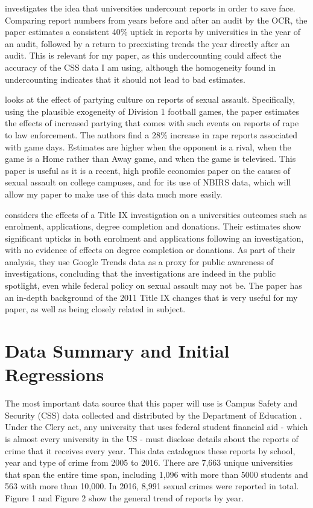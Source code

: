 \documentclass[AER]{AEA}
\begin{document}
 investigates the idea that universities undercount reports in order to save face.  Comparing report numbers from years before and after an audit by the OCR, the paper estimates a consistent 40\% uptick in reports by universities in the year of an audit, followed by a return to preexisting trends the year directly after an audit. This is relevant for my paper, as this undercounting could affect the accuracy of the CSS data I am using, although the homogeneity found in undercounting indicates that it should not lead to bad estimates.

 looks at the effect of partying culture on reports of sexual assault. Specifically, using the plausible exogeneity of Division 1 football games, the paper estimates the effects of increased partying that comes with such events on reports of rape to law enforcement. The authors find a 28\% increase in rape reports associated with game days. Estimates are higher when the opponent is a rival, when the game is a Home rather than Away game, and when the game is televised. This paper is useful as it is a recent, high profile economics paper on the causes of sexual assault on college campuses, and for its use of NBIRS data, which will allow my paper to make use of this data much more easily.

 considers the effects of a Title IX investigation on a universities outcomes such as enrolment, applications, degree completion and donations. Their estimates show significant upticks in both enrolment and applications following an investigation, with no evidence of effects on degree completion or donations. As part of their analysis, they use Google Trends data as a proxy for public awareness of investigations, concluding that the investigations are indeed in the public spotlight, even while federal policy on sexual assault may not be. The paper has an in-depth background of the 2011 Title IX changes that is very useful for my paper, as well as being closely related in subject. 

\section{Data Summary and Initial Regressions}

The most important data source that this paper will use is Campus Safety and Security (CSS) data collected and distributed by the Department of Education . Under the Clery act, any university that uses federal student financial aid - which is almost every university in the US - must disclose details about the reports of crime that it receives every year. This data catalogues these reports by school, year and type of crime from 2005 to 2016. There are 7,663 unique universities that span the entire time span, including 1,096 with more than 5000 students and 563 with more than 10,000. In 2016, 8,991 sexual crimes were reported in total. Figure 1 and Figure 2 show the general trend of reports by year.  
\end{document}
